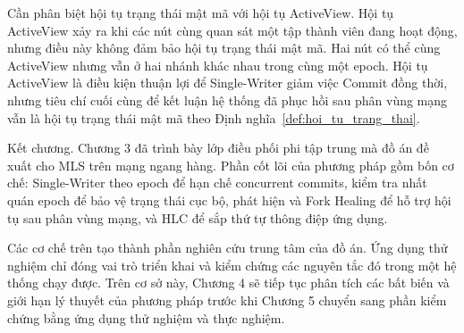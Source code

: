\documentclass[../DoAn.tex]{subfiles}
\begin{document}
Cần phân biệt hội tụ trạng thái mật mã với hội tụ ActiveView. Hội tụ ActiveView xảy ra khi các nút cùng quan sát một tập thành viên đang hoạt động, nhưng điều này không đảm bảo hội tụ trạng thái mật mã. Hai nút có thể cùng ActiveView nhưng vẫn ở hai nhánh khác nhau trong cùng một epoch. Hội tụ ActiveView là điều kiện thuận lợi để Single-Writer giảm việc Commit đồng thời, nhưng tiêu chí cuối cùng để kết luận hệ thống đã phục hồi sau phân vùng mạng vẫn là hội tụ trạng thái mật mã theo Định nghĩa~\ref{def:hoi_tu_trang_thai}.

Kết chương. Chương 3 đã trình bày lớp điều phối phi tập trung mà đồ án đề xuất cho MLS trên mạng ngang hàng. Phần cốt lõi của phương pháp gồm bốn cơ chế: Single-Writer theo epoch để hạn chế concurrent commits, kiểm tra nhất quán epoch để bảo vệ trạng thái cục bộ, phát hiện và Fork Healing để hỗ trợ hội tụ sau phân vùng mạng, và HLC để sắp thứ tự thông điệp ứng dụng.

Các cơ chế trên tạo thành phần nghiên cứu trung tâm của đồ án. Ứng dụng thử nghiệm chỉ đóng vai trò triển khai và kiểm chứng các nguyên tắc đó trong một hệ thống chạy được. Trên cơ sở này, Chương 4 sẽ tiếp tục phân tích các bất biến và giới hạn lý thuyết của phương pháp trước khi Chương 5 chuyển sang phần kiểm chứng bằng ứng dụng thử nghiệm và thực nghiệm.
\end{document}
